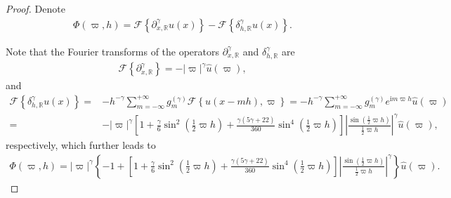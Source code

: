 \documentclass{siamart171218}
\numberwithin{theorem}{section}
\numberwithin{equation}{section}
\begin{document}
\begin{proof}
Denote
\begin{equation}\label{eq.2.4}
\begin{aligned}\displaystyle
\Phi(\varpi,h)=\mathcal{F}\left\{\partial_{x,\mathds{R}}^\gamma u(x)\right\}-
\mathcal{F}\left\{{\delta}_{h,\mathds{R}}^{\gamma}u(x)\right\}.
\end{aligned}
\end{equation}

Note that the Fourier transforms of the operators $\partial_{x,\mathds{R}}^\gamma$
and ${\delta}_{h,\mathds{R}}^{\gamma}$ are
\begin{equation*}
\begin{aligned}\displaystyle
\mathcal{F}\left\{\partial_{x,\mathds{R}}^\gamma\right\}
=-|\varpi|^\gamma\hat{u}(\varpi),
\end{aligned}
\end{equation*}
and
\begin{equation*}
\begin{aligned}\displaystyle
\mathcal{F}\left\{{\delta}_{h,\mathds{R}}^{\gamma}u(x)\right\}
=&-{h^{-\gamma}}\sum\limits_{m=-\infty}^{+\infty}
g_{m}^{(\gamma)}\mathcal{F}\left\{u\left(x-mh\right),\varpi\right\}=
-{h^{-\gamma}}\sum\limits_{m=-\infty}^{+\infty}
g_{m}^{(\gamma)}e^{\mathrm{i}m\varpi h}\hat{u}(\varpi)\\
 =&-|\varpi|^\gamma\left[1+\frac{\gamma}{6}\sin^2\left(\frac{1}{2}\varpi h\right)
 +\frac{\gamma(5\gamma+22)}{360}\sin^4\left(\frac{1}{2}\varpi h\right) \right]
 \left|\frac{\sin\left(\frac{1}{2}\varpi h\right)}{\frac{1}{2}\varpi h}\right|^\gamma\hat{u}(\varpi),
\end{aligned}
\end{equation*}
respectively, which further leads to
\begin{equation*}
\begin{aligned}\displaystyle
\Phi(\varpi,h)=|\varpi|^\gamma
\left\{-1+\left[1+\frac{\gamma}{6}\sin^2\left(\frac{1}{2}\varpi h\right)
 +\frac{\gamma(5\gamma+22)}{360}\sin^4\left(\frac{1}{2}\varpi h\right) \right]
 \left|\frac{\sin\left(\frac{1}{2}\varpi h\right)}{\frac{1}{2}\varpi h}\right|^\gamma\right\}\hat{u}(\varpi).
\end{aligned}
\end{equation*}


\end{proof}
\end{document}
